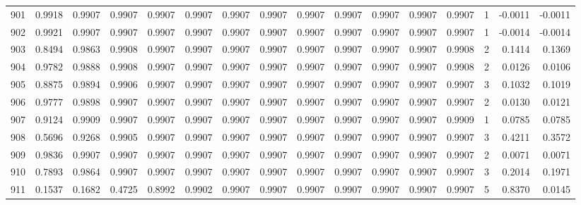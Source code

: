 \begin{tabular}{lrrrrrrrrrrrrrrr}
901 &      0.9918 &  0.9907 &  0.9907 &  0.9907 &  0.9907 &  0.9907 &  0.9907 &  0.9907 &  0.9907 &  0.9907 &   0.9907 &     0.9907 &      1 &                   -0.0011 &                    -0.0011 \\
902 &      0.9921 &  0.9907 &  0.9907 &  0.9907 &  0.9907 &  0.9907 &  0.9907 &  0.9907 &  0.9907 &  0.9907 &   0.9907 &     0.9907 &      1 &                   -0.0014 &                    -0.0014 \\
903 &      0.8494 &  0.9863 &  0.9908 &  0.9907 &  0.9907 &  0.9907 &  0.9907 &  0.9907 &  0.9907 &  0.9907 &   0.9907 &     0.9908 &      2 &                    0.1414 &                     0.1369 \\
904 &      0.9782 &  0.9888 &  0.9908 &  0.9907 &  0.9907 &  0.9907 &  0.9907 &  0.9907 &  0.9907 &  0.9907 &   0.9907 &     0.9908 &      2 &                    0.0126 &                     0.0106 \\
905 &      0.8875 &  0.9894 &  0.9906 &  0.9907 &  0.9907 &  0.9907 &  0.9907 &  0.9907 &  0.9907 &  0.9907 &   0.9907 &     0.9907 &      3 &                    0.1032 &                     0.1019 \\
906 &      0.9777 &  0.9898 &  0.9907 &  0.9907 &  0.9907 &  0.9907 &  0.9907 &  0.9907 &  0.9907 &  0.9907 &   0.9907 &     0.9907 &      2 &                    0.0130 &                     0.0121 \\
907 &      0.9124 &  0.9909 &  0.9907 &  0.9907 &  0.9907 &  0.9907 &  0.9907 &  0.9907 &  0.9907 &  0.9907 &   0.9907 &     0.9909 &      1 &                    0.0785 &                     0.0785 \\
908 &      0.5696 &  0.9268 &  0.9905 &  0.9907 &  0.9907 &  0.9907 &  0.9907 &  0.9907 &  0.9907 &  0.9907 &   0.9907 &     0.9907 &      3 &                    0.4211 &                     0.3572 \\
909 &      0.9836 &  0.9907 &  0.9907 &  0.9907 &  0.9907 &  0.9907 &  0.9907 &  0.9907 &  0.9907 &  0.9907 &   0.9907 &     0.9907 &      2 &                    0.0071 &                     0.0071 \\
910 &      0.7893 &  0.9864 &  0.9907 &  0.9907 &  0.9907 &  0.9907 &  0.9907 &  0.9907 &  0.9907 &  0.9907 &   0.9907 &     0.9907 &      3 &                    0.2014 &                     0.1971 \\
911 &      0.1537 &  0.1682 &  0.4725 &  0.8992 &  0.9902 &  0.9907 &  0.9907 &  0.9907 &  0.9907 &  0.9907 &   0.9907 &     0.9907 &      5 &                    0.8370 &                     0.0145 \\

\end{tabular}
